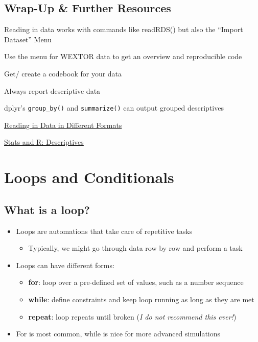 \documentclass[
]{book}
\providecommand{\tightlist}{%
  \setlength{\itemsep}{0pt}\setlength{\parskip}{0pt}}
\begin{document}
\section*{Wrap-Up \& Further Resources}\label{wrap-up-further-resources-4}

Reading in data works with commands like readRDS() but also the ``Import Dataset'' Menu

Use the menu for WEXTOR data to get an overview and reproducible code

Get/ create a codebook for your data

Always report descriptive data

dplyr's \texttt{group\_by()} and \texttt{summarize()} can output grouped descriptives

\href{https://www.datafiles.samhsa.gov/get-help/format-specific-issues/how-do-i-read-data-r}{Reading in Data in Different Formats}

\href{https://statsandr.com/blog/descriptive-statistics-in-r/}{Stats and R: Descriptives}

\chapter{Loops and Conditionals}\label{loops-and-conditionals}

\section{What is a loop?}\label{what-is-a-loop}

\begin{itemize}
\tightlist
\item
  Loops are automations that take care of repetitive tasks

  \begin{itemize}
  \tightlist
  \item
    Typically, we might go through data row by row and perform a task
  \end{itemize}
\item
  Loops can have different forms:

  \begin{itemize}
  \tightlist
  \item
    \textbf{for}: loop over a pre-defined set of values, such as a number sequence
  \item
    \textbf{while}: define constraints and keep loop running as long as they are met
  \item
    \textbf{repeat}: loop repeats until broken (\emph{I do not recommend this ever!})
  \end{itemize}
\item
  For is most common, while is nice for more advanced simulations
\end{itemize}
\end{document}
